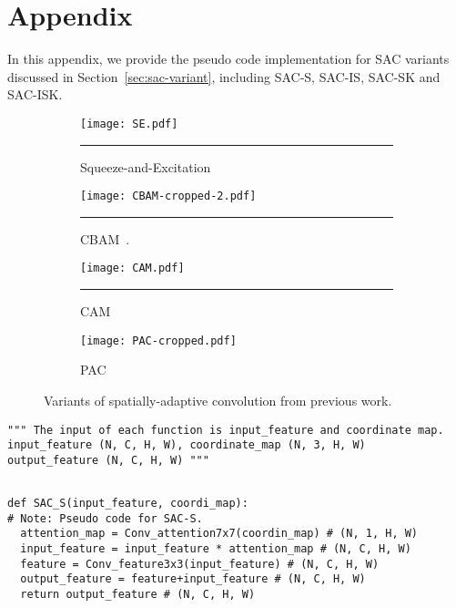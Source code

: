 \documentclass[runningheads]{llncs}
\begin{document}
\clearpage



\clearpage
\section{Appendix}

In this appendix, we provide the pseudo code implementation for SAC variants discussed in Section~\ref{sec:sac-variant}, including SAC-S, SAC-IS, SAC-SK and SAC-ISK. 

\begin{figure}[t!]
     \centering
     \begin{subfigure}[b]{0.75\textwidth}
         \centering
         \texttt{[image: SE.pdf]}
         \caption{ Squeeze-and-Excitation~\cite{hu2018squeeze}}
         \hrule
         \label{fig:SE}
     \end{subfigure}
     \hfill
          \begin{subfigure}[b]{0.75\textwidth}
         \centering
         \texttt{[image: CBAM-cropped-2.pdf]}
         \caption{CBAM~\cite{woo2018cbam}.}
         \hrule
         \label{fig:CBAM}
     \end{subfigure}
          \hfill
          \begin{subfigure}[b]{0.75\textwidth}
         \centering
         \texttt{[image: CAM.pdf]}
         \caption{CAM~\cite{wu2018squeezesegv2}}
         \hrule
         \label{fig:CAM}
     \end{subfigure}
               \hfill
          \begin{subfigure}[b]{0.75\textwidth}
         \centering
         \texttt{[image: PAC-cropped.pdf]}
         \caption{PAC~\cite{su2019pixel}}
         \label{fig:PAC}
     \end{subfigure}
     \hfill
     
    \caption{Variants of spatially-adaptive convolution from previous work.}
    \label{fig:others}
\end{figure}

\begin{verbatim}
""" The input of each function is input_feature and coordinate map.
input_feature (N, C, H, W), coordinate_map (N, 3, H, W)
output_feature (N, C, H, W) """
\end{verbatim}
\begin{verbatim}

def SAC_S(input_feature, coordi_map):
# Note: Pseudo code for SAC-S.
  attention_map = Conv_attention7x7(coordin_map) # (N, 1, H, W)
  input_feature = input_feature * attention_map # (N, C, H, W)
  feature = Conv_feature3x3(input_feature) # (N, C, H, W)
  output_feature = feature+input_feature # (N, C, H, W)
  return output_feature # (N, C, H, W)
\end{verbatim}
\end{document}
